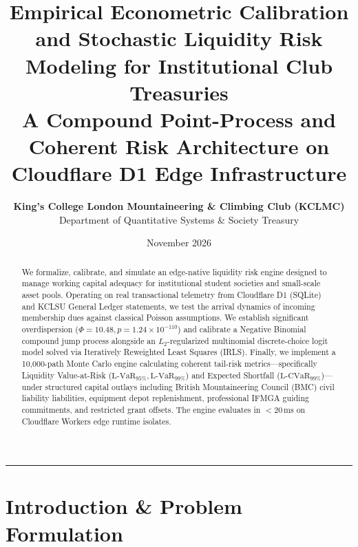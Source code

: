 \documentclass[11pt,a4paper]{article}
\title{\textbf{Empirical Econometric Calibration and Stochastic Liquidity Risk Modeling for Institutional Club Treasuries}\\
\large A Compound Point-Process and Coherent Risk Architecture on Cloudflare D1 Edge Infrastructure}
\author{\textbf{King's College London Mountaineering \& Climbing Club (KCLMC)}\\
Department of Quantitative Systems \& Society Treasury}
\date{November 2026}
\begin{document}
\maketitle

\begin{abstract}
We formalize, calibrate, and simulate an edge-native liquidity risk engine designed to manage working capital adequacy for institutional student societies and small-scale asset pools. Operating on real transactional telemetry from Cloudflare D1 (SQLite) and KCLSU General Ledger statements, we test the arrival dynamics of incoming membership dues against classical Poisson assumptions. We establish significant overdispersion ($\Phi = 10.48, p = 1.24 \times 10^{-110}$) and calibrate a Negative Binomial compound jump process alongside an $L_2$-regularized multinomial discrete-choice logit model solved via Iteratively Reweighted Least Squares (IRLS). Finally, we implement a 10,000-path Monte Carlo engine calculating coherent tail-risk metrics---specifically Liquidity Value-at-Risk ($\text{L-VaR}_{95\%}, \text{L-VaR}_{99\%}$) and Expected Shortfall ($\text{L-CVaR}_{99\%}$)---under structured capital outlays including British Mountaineering Council (BMC) civil liability liabilities, equipment depot replenishment, professional IFMGA guiding commitments, and restricted grant offsets. The engine evaluates in $<20\,\text{ms}$ on Cloudflare Workers edge runtime isolates.
\end{abstract}

\vspace{1em}
\hrule
\vspace{1em}

\section{Introduction \& Problem Formulation}
\end{document}
